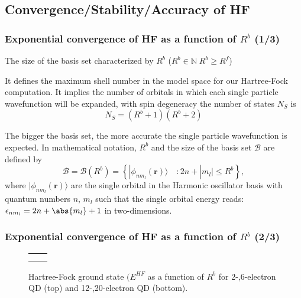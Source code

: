 \documentclass[xcolor=pdftex,hyperref={pdfpagelabels=false},table]{beamer}
\begin{document}
\subsection{Convergence/Stability/Accuracy of HF}
\begin{frame}
\frametitle{Exponential convergence of HF as a function of $R^b$ (1/3)}
\begin{scriptsize}
\begin{definition}
The size of the basis set characterized by $R^b$ ($R^b\in\mathbb{N} \; R^b\geq R^f$)

It defines the maximum shell number in the model space for our Hartree-Fock computation. It implies the number of orbitals in which each single particle wavefunction will be expanded, with spin degeneracy the number of states $N_S$ is
\begin{equation}
 N_S=(R^b+1)(R^b+2)
\end{equation}

The bigger the basis set, the more accurate the single particle wavefunction is expected. In mathematical notation, $R^b$ and the size of the basis set $\mathcal{B}$ are defined by
\begin{equation}
 \mathcal{B} = \mathcal{B}(R^b) = \left\{ | \phi_{n m_l}(\textbf{r})\rangle   \quad : 2n+ |m_l| \leq R^b  \right\},
\end{equation} 
where $| \phi_{n m_l}(\textbf{r})\rangle$ are the single orbital in the Harmonic oscillator basis with quantum numbers $n$, $m_l$ such that the single orbital energy reads: $\epsilon_{n m_l}=2n+\abs{m_l}+1$ in two-dimensions.
\end{definition}
\end{scriptsize}
\end{frame}


\begin{frame}
\frametitle{Exponential convergence of HF as a function of $R^b$ (2/3)}
\begin{scriptsize}
\begin{figure}
	\begin{center}
\begin{tabular}{cc}
	\scalebox{0.35}{} & 	\scalebox{0.35}{}  \\
	\scalebox{0.35}{}  & 	\scalebox{0.35}{}  \\
\end{tabular}
	\end{center}
	\vspace{-5pt}
	\caption{Hartree-Fock ground state $(E^{HF}$ as a function of $R^b$ for 2-,6-electron QD (top) and 12-,20-electron QD (bottom).}
\end{figure}
\end{scriptsize}
\end{frame}
\end{document}
